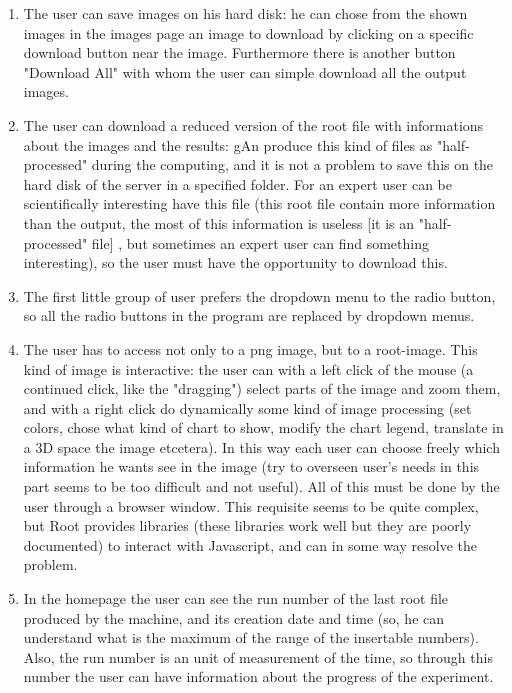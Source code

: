 \begin{enumerate}
\item The user can save images on his hard disk: he can chose from the shown images in the images page an image to download by clicking on a specific download button near the image. Furthermore there is another button "Download All" with whom the user can simple download all the output images.

\item The user can download a reduced version of the root file with informations about the images and the results: gAn produce this kind of files as "half-processed" during the computing, and it is not a problem to save this on the hard disk of the server in a specified folder. For an expert user can be scientifically interesting have this file (this root file contain more information than the output, the most of this information is useless [it is an "half-processed" file] , but sometimes an expert user can find something interesting), so the user must have the opportunity to download this.     

\item The first little group of user prefers the dropdown menu to the radio button, so all the radio buttons in the program are replaced by dropdown menus.

\item The user has to access not only to a png image, but to a root-image. This kind of image is interactive: the user can with a left click of the mouse (a continued click, like the "dragging") select parts of the image and zoom them, and with a right click do dynamically some kind of image processing (set colors, chose  what kind of chart to show, modify the chart legend, translate in a 3D space the image etcetera). In this way each user can choose freely which information he wants see in the image (try to overseen user's needs in this part seems to be too difficult and not useful).
All of this must be done by the user through a browser window. This requisite seems to be quite complex, but Root provides libraries (these libraries work well but they are poorly documented) to interact with Javascript, and can in some way resolve the problem.  

\item In the homepage the user can see the run number of the last root file produced by the machine, and its creation date and time (so, he can understand what is the maximum of the range of the insertable numbers). Also, the run number is an unit of measurement of the time, so through this number the user can have information about the progress of the experiment.  


\end{enumerate}
